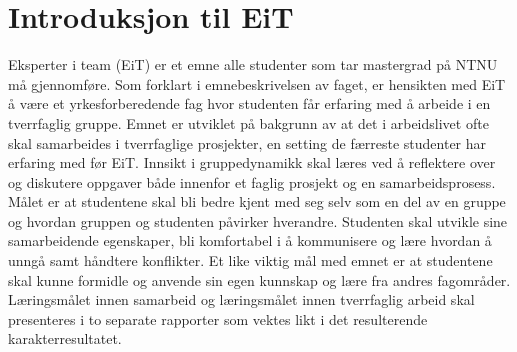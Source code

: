 \section{Introduksjon til EiT}

Eksperter i team (EiT) er et emne alle studenter som tar mastergrad på NTNU må gjennomføre.
Som forklart i emnebeskrivelsen\cite{eitlaeringsmaal} av faget, er hensikten med EiT å være et yrkesforberedende fag hvor studenten får erfaring med å arbeide i en tverrfaglig gruppe.
Emnet er utviklet på bakgrunn av at det i arbeidslivet ofte skal samarbeides i tverrfaglige prosjekter, en setting de færreste studenter har erfaring med før EiT.
Innsikt i gruppedynamikk skal læres ved å reflektere over og diskutere oppgaver både innenfor et faglig prosjekt og en samarbeidsprosess.
Målet er at studentene skal bli bedre kjent med seg selv som en del av en gruppe og hvordan gruppen og studenten påvirker hverandre.
Studenten skal utvikle sine samarbeidende egenskaper, bli komfortabel i å kommunisere og lære hvordan å unngå samt håndtere konflikter.
Et like viktig mål med emnet er at studentene skal kunne formidle og anvende sin egen kunnskap og lære fra andres fagområder.
Læringsmålet innen samarbeid og læringsmålet innen tverrfaglig arbeid skal presenteres i to separate rapporter som vektes likt i det resulterende karakterresultatet.
